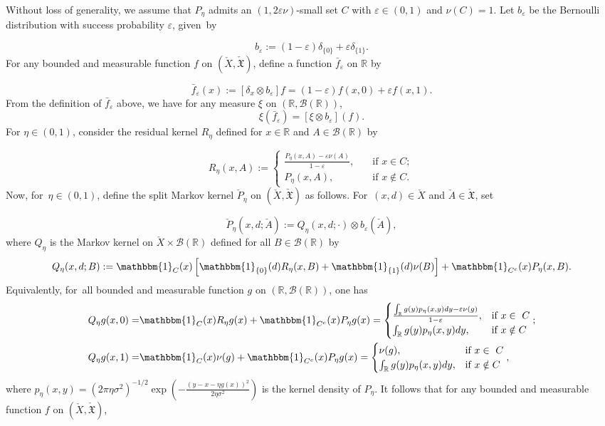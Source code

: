 \documentclass[11pt]{elsarticle}
\def\R{\mathbb{R}}
\begin{document}
Without loss of generality, we assume that $P_\eta$ admits an $(1,2\varepsilon\nu)$-small set $C$ with $\varepsilon\in(0,1)$ and $\nu(C)=1$. Let $b_{\varepsilon}$ be the Bernoulli distribution with success probability $\varepsilon$, given~by

$$b_\varepsilon:=(1-\varepsilon)\delta_{\{0\}}+\varepsilon\delta_{\{1\}}.$$
For any bounded and measurable function $f$ on $(\check{X},\check{\mathfrak{X}})$, define a function $\bar{f}_{\varepsilon}$ on $\R$ by

$$\bar{f}_{\varepsilon}(x):=[\delta_x\otimes b_\varepsilon]f=(1-\varepsilon)f(x,0)+\varepsilon f(x,1).$$
From the definition of $\bar{f}_{\varepsilon}$ above, we have for any measure $\xi$ on $(\R, \mathcal{B}(\R))$,
$$\xi(\bar{f}_{\varepsilon})=[\xi\otimes b_\varepsilon](f).$$
For $\eta\in(0,1)$, consider the residual kernel $R_\eta$ defined for $x\in\R$ and $A\in\mathcal{B}(\R)$ by

$$R_\eta(x,A):=\begin{cases}
	\frac{P_\eta(x,A)-\varepsilon\nu(A)}{1-\varepsilon},&\quad\text{if }x\in C;\\
	P_\eta(x,A),&\quad\text{if }x\notin C.
\end{cases}$$
Now, for~$\eta\in(0,1)$, define the split Markov kernel $\check{P}_\eta$ on $(\check{X},\check{\mathfrak{X}})$ as follows. For~$(x,d)\in\check{X}$ and $\check{A}\in\check{\mathfrak{X}}$, set

$$\check{P}_\eta(x,d;\check{A}):=Q_\eta(x,d;\cdot)\otimes b_\varepsilon(\check{A}),$$
where $Q_\eta$ is the Markov kernel on $\check{X}\times\mathcal{B}(\R)$ defined for all $B\in\mathcal{B}(\R)$ by
\vspace{-3pt}
$$Q_\eta(x,d;B):=\mathbbm{1}_C(x)\left[\mathbbm{1}_{\{0\}}(d)R_\eta(x,B)+\mathbbm{1}_{\{1\}}(d)\nu(B)\right]+\mathbbm{1}_{C^c}(x)P_\eta(x,B).$$
Equivalently, for~all bounded and measurable function $g$ on $(\R,\mathcal{B}(\R))$, one has
\vspace{-3pt}
\begin{align*}
	Q_\eta g(x,0)=&\mathbbm{1}_C(x)R_\eta g(x)+\mathbbm{1}_{C^c}(x)P_\eta g(x)=\begin{cases}
		\frac{\int_\R g(y)p_\eta(x,y)d y-\varepsilon\nu(g)}{1-\varepsilon},&\text{if }x\in~C\\
		\int_{\R}g(y)p_\eta(x,y)d y,&\text{if }x\notin C
	\end{cases};\\
	Q_\eta g(x,1)=&\mathbbm{1}_C(x)\nu (g)+\mathbbm{1}_{C^c}(x)P_\eta g(x)=\begin{cases}
		\nu(g),&\text{if }x\in~C\\
		\int_{\R}g(y)p_\eta(x,y)d y,&\text{if }x\notin C
	\end{cases},
\end{align*}
where $p_\eta(x,y)=(2\pi\eta\sigma^2)^{-1/2}\exp{\left(-\frac{(y-x-\eta g(x))^2}{2\eta\sigma^2}\right)}$ is the kernel density of $P_\eta$. It follows that for any bounded and measurable function $f$ on $(\check{X},\check{\mathfrak{X}})$,
\end{document}

